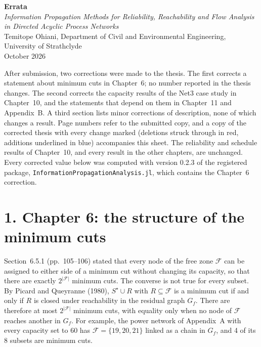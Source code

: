 \documentclass[11pt]{article}
\begin{document}
{\large\bfseries Errata}\\[2pt]
\emph{Information Propagation Methods for Reliability, Reachability and Flow Analysis in
Directed Acyclic Process Networks}\\
Temitope Ohiani, Department of Civil and Environmental Engineering, University of Strathclyde\\
October 2026

\medskip
After submission, two corrections were made to the thesis. The first corrects a statement
about minimum cuts in Chapter~6; no number reported in the thesis changes. The second
corrects the capacity results of the Net3 case study in Chapter~10, and the statements that
depend on them in Chapter~11 and Appendix~B. A third section lists minor corrections of
description, none of which changes a result. Page numbers refer to the submitted copy, and a
copy of the corrected thesis with every change marked (deletions struck through in red,
additions underlined in blue) accompanies this sheet. The
reliability and schedule results of Chapter~10, and every result in the other chapters, are
unchanged. Every corrected value below was computed with version 0.2.3 of the registered
package, \texttt{InformationPropagationAnalysis.jl}, which contains the Chapter~6 correction.

\section*{1. Chapter 6: the structure of the minimum cuts}

Section~6.5.1 (pp.~105--106) stated that every node of the free zone $\mathcal{F}$ can be
assigned to either side of a minimum cut without changing its capacity, so that there are
exactly $2^{|\mathcal{F}|}$ minimum cuts. The converse is not true for every subset. By
Picard and Queyranne (1980), $S^\star \cup R$ with $R \subseteq \mathcal{F}$ is a minimum
cut if and only if $R$ is closed under reachability in the residual graph $G_f$. There are
therefore at most $2^{|\mathcal{F}|}$ minimum cuts, with equality only when no node of
$\mathcal{F}$ reaches another in $G_f$. For example, the power network of Appendix~A with
every capacity set to 60 has $\mathcal{F} = \{19, 20, 21\}$ linked as a chain in $G_f$, and
4 of its 8 subsets are minimum cuts.
\end{document}
